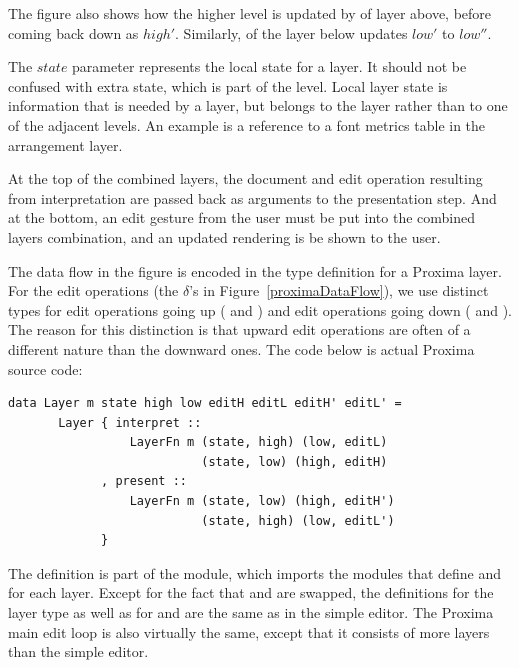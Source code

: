 \documentclass[preprint,natbib]{sigplanconf}
\begin{document}
The figure also shows how the higher level is updated by  of layer above, before coming back down as $high'$. Similarly,  of the layer below updates $low'$ to $low''$. 

The $state$ parameter represents the local state for a layer. It should not be confused with extra state, which is part of the level. Local layer state is information that is needed by a layer, but belongs to the layer rather than to one of the adjacent levels. An example is a reference to a font metrics table in the arrangement layer.

At the top of the combined layers, the document and edit operation resulting from interpretation are passed back as arguments to the presentation step. And at the bottom, an edit gesture from the user must be put into the combined layers combination, and an updated rendering is be shown to the user. 
\ec

The data flow in the figure is encoded in the type definition for a Proxima layer. For the edit operations (the $\delta$'s in Figure~\ref{proximaDataFlow}), we use distinct types for edit operations going up ( and ) and edit operations going down ( and ). The reason for this distinction is that upward edit operations are often of a different nature than the downward ones. The code below is actual Proxima source code:

\begin{small}
\begin{verbatim}
data Layer m state high low editH editL editH' editL' =
       Layer { interpret ::
                 LayerFn m (state, high) (low, editL)
                           (state, low) (high, editH)
             , present ::
                 LayerFn m (state, low) (high, editH')
                           (state, high) (low, editL')
             }
\end{verbatim}
\end{small}

The  definition is part of the  module, which imports the modules that define  and  for each layer. Except for the fact that  and  are swapped, the definitions for the layer type as well as for  and  are the same as in the simple editor. The Proxima main edit loop is also virtually the same, except that it consists of more layers than the simple editor.


\bc
\bigskip
\end{document}
